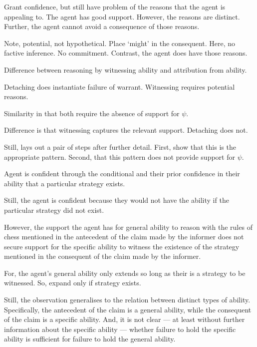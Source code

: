 \documentclass[10pt]{article}
\begin{document}
\begin{note}
  Grant confidence, but still have problem of the reasons that the agent is appealing to.
  The agent has good support.
  However, the reasons are distinct.
  Further, the agent cannot avoid a consequence of those reasons.

  Note, potential, not hypothetical.
  Place `might' in the consequent.
  Here, no factive inference.
  No commitment.
  Contrast, the agent does have those reasons.
\end{note}

\begin{note}
  Difference between reasoning by witnessing ability and attribution from ability.

  Detaching does instantiate failure of warrant.
  Witnessing requires potential reasons.

  Similarity in that both require the absence of support for \(\psi\).

  Difference is that witnessing captures the relevant support.
  Detaching does not.

  Still, lays out a pair of steps after further detail.
  First, show that this is the appropriate pattern.
  Second, that this pattern does not provide support for \(\psi\).
\end{note}

\begin{note}
  Agent is confident through the conditional and their prior confidence in their ability that a particular strategy exists.

  Still, the agent is confident because they would not have the ability if the particular strategy did not exist.

  However, the support the agent has for general ability to reason with the rules of chess mentioned in the antecedent of the claim made by the informer does not secure support for the specific ability to witness the existence of the strategy mentioned in the consequent of the claim made by the informer.

  For, the agent's general ability only extends so long as their is a strategy to be witnessed.
  So, expand only if strategy exists.
\end{note}

\begin{note}
  Still, the observation generalises to the relation between distinct types of ability.
Specifically, the antecedent of the claim is a general ability, while the consequent of the claim is a specific ability.
And, it is not clear --- at least without further information about the specific ability --- whether failure to hold the specific ability is sufficient for failure to hold the general ability.
\end{note}
\end{document}
